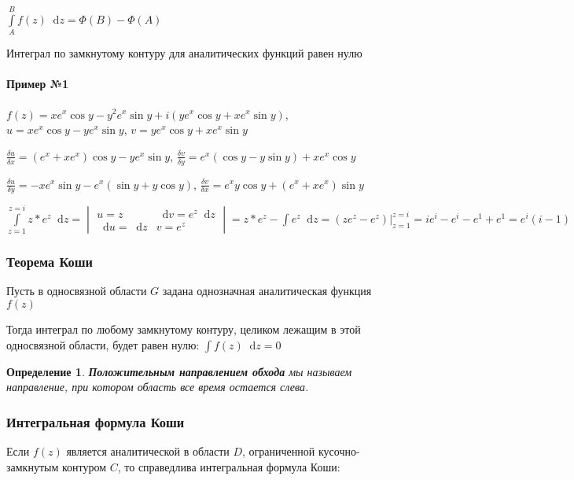 \documentclass{article}
\newcommand*\diff{\mathop{}\!\mathrm{d}}
\newtheorem{definition}{Определение}
\begin{document}
$\int\limits_{A}^{B} f(z) \diff z = \Phi (B) - \Phi (A)$

Интеграл по замкнутому контуру для аналитических функций равен нулю

\paragraph{Пример №1}

$f(z) = x e^{x} \cos y - y^2 e^{x} \sin y + i (y e^{x} \cos y + x e^{x} \sin y)$, $u = x e^{x} \cos y - y e^{x} \sin y$, $v = y e^{x} \cos y + x e^{x} \sin y$

$\frac{\delta u}{\delta x} = (e^{x} + x e^{x}) \cos y - y e^{x} \sin y$, $\frac{\delta v}{\delta y} = e^{x} (\cos y - y \sin y) + x e^{x} \cos y$

$\frac{\delta u}{\delta y} = - x e^{x} \sin y - e^{x} (\sin y + y \cos y)$, $\frac{\delta v}{\delta x} = e^{x} y \cos y + (e^{x} + x e^{x}) \sin y$

$\int\limits_{z = 1}^{z = i} z * e^{z} \diff z = \begin{vmatrix}
    u = z & \diff v = e^{z} \diff z \\
    \diff u = \diff z & v = e^{z}
\end{vmatrix} = z * e^{z} - \int e^{z} \diff z = (z e^{z} - e^{z}) \bigg|_{z = 1}^{z = i} = i e^{i} - e^{i} - e^{1} + e^{1} = e^{i} (i - 1)$

\subsubsection{Теорема Коши}

Пусть в односвязной области $G$ задана однозначная аналитическая функция $f(z)$

Тогда интеграл по любому замкнутому контуру, целиком лежащим в этой односвязной области, будет равен нулю: $\int f(z) \diff z = 0$

\begin{definition}
\textbf{Положительным направлением обхода} мы называем направление, при котором область все время остается слева.
\end{definition}

\subsubsection{Интегральная формула Коши}

Если $f(z)$ является аналитической в области $D$, ограниченной кусочно-замкнутым контуром $C$, то справедлива интегральная формула Коши:
\end{document}

